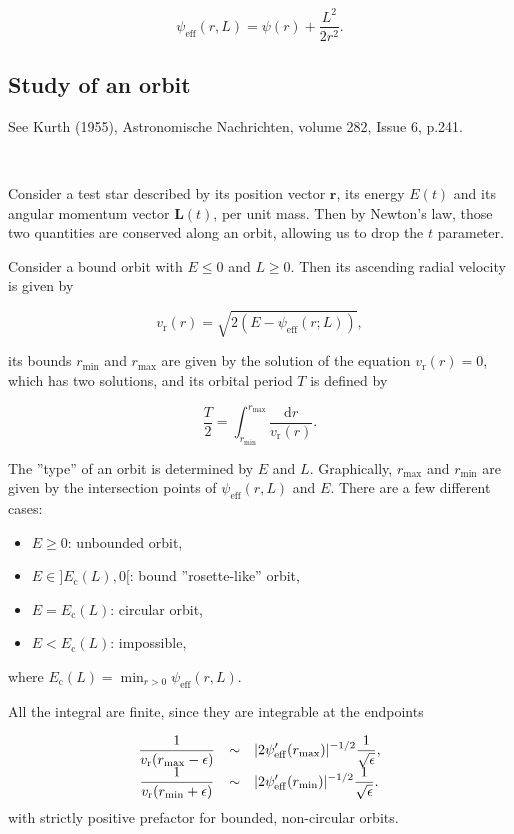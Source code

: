 \documentclass[11pt]{article}
\newcommand{\rr}{\mathrm{r}}
\newcommand{\vr}{v_{\rr}}
\newcommand{\br}{\boldsymbol{r}}
\newcommand{\rd}{{\mathrm{d}}}
\newcommand{\rmax}{r_{\max}}
\newcommand{\rmin}{r_{\min}}
\newcommand{\psieff}{\psi_{\mathrm{eff}}}
\newcommand{\bL}{\boldsymbol{L}}
\newcommand{\Ec}{E_{{\mathrm{c}}}}
\begin{document}
\begin{equation}
  \psieff(r,L) = \psi(r) + \frac{L^{2}}{2r^{2}} .
  \label{eq:Effective_potential}
  \end{equation}

\subsection{Study of an orbit}
\label{subsec:OrbitGlobular}

See Kurth (1955), Astronomische Nachrichten, volume 282, Issue
6, p.241.

~

Consider a test star described by its position vector $\br$,
its energy  $E(t)$ and its angular
momentum vector $\bL(t)$, per unit mass. Then by Newton's law, those two quantities are conserved along an orbit, allowing us to drop the $t$ parameter.

Consider a bound orbit with $E\leq 0$ and $L \geq 0$. Then its ascending radial velocity is given by

\begin{equation}
  \vr(r) = \sqrt{2(E-\psieff(r;L))} ,
  \label{eq:radial_velocity}
\end{equation}

its bounds $\rmin$ and $\rmax$ are given by the solution of the equation $\vr(r)=0$, which has two solutions, and its orbital period $T$ is defined by

\begin{equation}
 \frac{T}{2}=\int_{\rmin}^{\rmax}\frac{{\rd}r}{\vr(r)} .
  \label{eq:orbital_period}
  \end{equation}

The ''type'' of an orbit is determined by $E$ and $L$. Graphically, $\rmax$ and $\rmin$ are given by the intersection points of $\psieff(r,L)$ and $E$. There are a few different cases:
\begin{itemize}
\item $E \geq 0$: unbounded orbit,
\item $E \in ]\Ec(L),0[$: bound ''rosette-like'' orbit,
\item $E = \Ec(L)$: circular orbit,
\item $E < \Ec(L)$: impossible,
\end{itemize}
where $\Ec(L) = \min_{r>0}\psieff(r,L)$.

All the integral are finite, since they are integrable at the endpoints

\begin{equation}
\begin{array}{ccl}
 \displaystyle{\frac{1}{\vr(\rmax-\epsilon)}} & \sim& \displaystyle{|2\psi_{{\rm eff}}'(r_{\max})|^{-1/2}\frac{1}{\sqrt{\epsilon}}} ,\\
  
 \displaystyle{\frac{1}{\vr(\rmin+\epsilon)}} & \sim&\displaystyle{|2\psi_{{\rm eff}}'(r_{\min})|^{-1/2}\frac{1}{\sqrt{\epsilon}}} .
\end{array}
\label{eq:integrable_T}
\end{equation}
with strictly positive prefactor for bounded, non-circular orbits.
\end{document}
